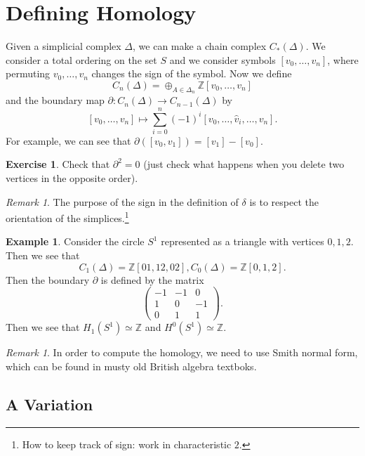 \documentclass[leqno, openany]{memoir}
\theoremstyle{definition}
\newtheorem{exm}[thm]{Example}
\newtheorem{exer}[thm]{Exercise}
\theoremstyle{remark}
\newtheorem{rmk}[thm]{Remark}
\theoremstyle{plain}
\theoremstyle{definition}
\theoremstyle{remark}
\newcommand{\Z}{\mathbb{Z}}
\begin{document}
\section{Defining Homology}%

Given a simplicial complex $\Delta$, we can make a chain complex $C_*(\Delta)$.
We consider a total ordering on the set $S$ and we consider symbols $[v_0,
\ldots, v_n]$, where permuting $v_0, \ldots, v_n$ changes the sign of the
symbol. Now we define \[ C_n(\Delta) = \oplus_{A \in \Delta_n} \Z [v_0, \ldots,
v_n] \] and the boundary map $\partial: C_n(\Delta) \to C_{n-1}(\Delta)$ by \[
[v_0, \ldots, v_n] \mapsto \sum_{i=0}^n (-1)^i [v_0, \ldots, \widehat{v}_i,
\ldots, v_n].\] For example, we can see that $\partial([v_0, v_1]) = [v_1] -
[v_0]$.

\begin{exer} Check that $\partial^2 = 0$ (just check what happens when you
delete two vertices in the opposite order).  \end{exer}

\begin{rmk} The purpose of the sign in the definition of $\delta$ is to respect
the orientation of the simplices.\footnote{How to keep track of sign: work in
characteristic $2$.} \end{rmk}

\begin{exm} Consider the circle $S^1$ represented as a triangle with vertices
    $0,1,2$. Then we see that \[ C_1(\Delta) = \Z[01,12,02],
        C_0(\Delta)=\Z[0,1,2].\] Then the boundary $\partial$ is defined by the
        matrix \[ \begin{pmatrix} -1 & -1 & 0 \\ 1 & 0 & -1 \\ 0 & 1 & 1
        \end{pmatrix}. \] Then we see that $H_1(S^1) \simeq \Z$ and $H^0(S^1)
    \simeq \Z$.  \end{exm}

\begin{rmk} In order to compute the homology, we need to use Smith normal form,
which can be found in musty old British algebra textboks.  \end{rmk}

\subsection{A Variation}%
\end{document}

